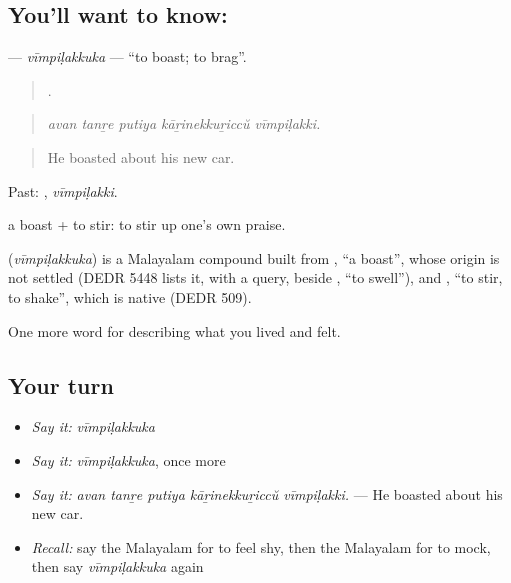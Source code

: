 \subsection*{You'll want to know: }
\textbf{} — \emph{vīmpiḷakkuka} — \textquotedblleft{}to boast; to brag\textquotedblright{}.

\begin{quote}
    .
\end{quote}

\begin{quote}
\emph{avan tanṟe putiya kāṟinekkuṟiccŭ vīmpiḷakki.}
\end{quote}

\begin{quote}
He boasted about his new car.
\end{quote}

Past: , \emph{vīmpiḷakki}.

 a boast +  to stir: to stir up one's own praise.

\begin{cousinweb}
\textbf{} (\emph{vīmpiḷakkuka}) is a Malayalam compound built from , \textquotedblleft{}a boast\textquotedblright{}, whose origin is not settled (DEDR 5448 lists it, with a query, beside , \textquotedblleft{}to swell\textquotedblright{}), and , \textquotedblleft{}to stir, to shake\textquotedblright{}, which is native (DEDR 509).
\end{cousinweb}

\begin{grammarlens}[title={What you've built}]
One more word for describing what you lived and felt.
\end{grammarlens}

\subsection*{Your turn}
\begin{itemize}
\raggedright
  \item \emph{Say it:} \emph{vīmpiḷakkuka}
  \item \emph{Say it:} \emph{vīmpiḷakkuka}, once more
  \item \emph{Say it:} \emph{avan tanṟe putiya kāṟinekkuṟiccŭ vīmpiḷakki.} — He boasted about his new car.
  \item \emph{Recall:} say the Malayalam for to feel shy, then the Malayalam for to mock, then say \emph{vīmpiḷakkuka} again
\end{itemize}

